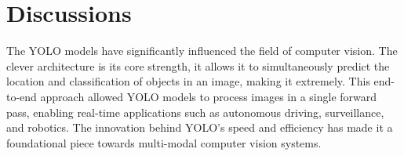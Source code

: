 \documentclass{article}
\begin{document}

\section{Discussions}

The YOLO models have significantly influenced the field of computer vision. The clever architecture is its core strength, it allows it to simultaneously predict the location and classification of objects in an image, making it extremely. This end-to-end approach allowed YOLO models to process images in a single forward pass, enabling real-time applications such as autonomous driving, surveillance, and robotics. The innovation behind YOLO's speed and efficiency has made it a foundational piece towards multi-modal computer vision systems.


\end{document}
